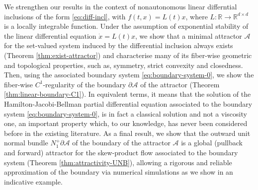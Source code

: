 \documentclass[reqno]{amsart}
\theoremstyle{definition}
\numberwithin{equation}{section}
\newcommand{\R}{\mathbb{R}}
\newcommand{\A}{\mathcal{A}}
\begin{document}
We strengthen our results in the context of nonautonomous linear differntial inclusions of the form \eqref{eq:diff-incl},  with $f(t,x)=L(t)x$, where $ L:\R\to\R^{d\times d}$ is a locally integrable function. Under the assumption of exponential stability of the linear differential equation $\dot x=L(t)x$, we show that a minimal attractor $\A$ for the set-valued system induced by the differential inclusion always exists (Theorem \ref{thm:exist-attractor}) and characterise many of its fiber-wise geometric and topological properties, such as, symmetry, strict convexity and closedness. Then, using the associated boundary system \eqref{eq:boundary-system-0}, we show the fiber-wise $C^1$-regularity of the boundary $\partial \A$ of the attractor (Theorem \ref{thm:linear-boundary-C1}). In equivalent terms, it means that the solution of the Hamilton-Jacobi-Bellman partial differential equation associated to the boundary system \eqref{eq:boundary-system-0}, is in fact a classical solution and not a viscosity one, an important property which, to our knowledge, has never been considered before in the existing literature. %
As a final result, we show that the outward unit normal bundle $N_1^+\partial \A$ of the boundary of the attractor $\A$ is a global (pullback and forward) attractor for the skew-product flow associated to the boundary system (Theorem \ref{thm:attractivity-UNB}), allowing a rigorous and reliable approximation of the boundary via numerical simulations as we show in an indicative example. 



\end{document}
